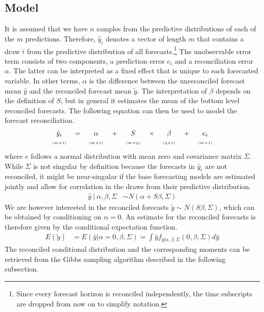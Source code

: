 \documentclass[a4paper,fleqn,11pt]{article}
\begin{document}
\subsection{Model}
It is assumed that we have $n$ samples from the predictive distributions of each of the $m$ predictions. Therefore, $\hat{y}_{i}$ denotes a vector of length $m$ that contains a draw $i$ from the predictive distribution of all forecasts.\footnote{Since every forecast horizon is reconciled independently, the time subscripts are dropped from now on to simplify notation.} The unobservable error term consists of two components, a prediction error $e_{i}$ and a reconciliation error $\alpha$. The latter can be interpreted as a fixed effect that is unique to each forecasted variable. In other terms, $\alpha$ is the difference between the unreconciled forecast mean $\hat{y}$ and the reconciled forecast mean $\tilde{y}$. The interpretation of $\beta$ depends on the definition of $S$, but in general it estimates the mean of the bottom level reconciled forecasts. The following equation can then be used to model the forecast reconciliation.
\begin{align}
\label{eq:main}
\begin{tabular}{ccccccccc}
	$\hat{y}_i$ & $=$ & $\alpha$ & + &$S$ & $\times$ & $\beta$ & $+$ & $e_i$ \\
	$\scriptscriptstyle (m\times 1)$ & & $\scriptscriptstyle (m\times 1)$  & & $ \scriptscriptstyle (m\times q) $ & & $\scriptscriptstyle (q\times 1)$ & & $\scriptscriptstyle (m\times 1)$
\end{tabular}
\end{align}
where $e$ follows a normal distribution with mean zero and covariance matrix $\Sigma$. While $\Sigma$ is not singular by definition because the forecasts in $\hat{y}_{i}$ are not reconciled, it might be near-singular if the base forecasting models are estimated jointly and allow for correlation in the draws from their predictive distribution. 
\begin{align}
\hat{y}\ |\ \alpha,\beta,\Sigma &\sim N(\alpha + S\beta,\Sigma)
\end{align}
We are however interested in the reconciled forecasts $\tilde{y} \sim N(S\beta,\Sigma)$, which can be obtained by conditioning on $\alpha = 0$. An estimate for the reconciled forecasts is therefore given by the conditional expectation function.
\begin{align}
	E(\tilde{y}) &= E(\hat{y}|\alpha = 0,\beta,\Sigma) = \int \hat{y} f_{\hat{y}|\alpha,\beta,\Sigma}(0,\beta,\Sigma) d\hat{y} 
\end{align}
The reconciled conditional distribution and the corresponding moments can be retrieved from the Gibbs sampling algorithm described in the following subsection.\\
\end{document}
